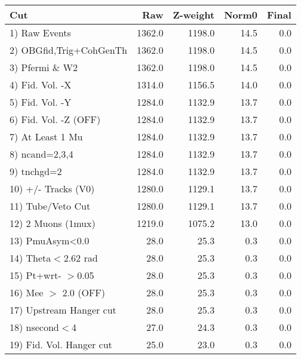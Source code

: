  \begin{table}[h!]\centering
 \begin{tabular}{||l||r|r|r|r||}
 \hline
 \hline
 Cut & Raw & Z-weight & Norm0 & Final \\
 \hline
  1) Raw Events           &      1362.0 &      1198.0 &        14.5 &         0.0 \\
  2) OBGfid,Trig+CohGenTh &      1362.0 &      1198.0 &        14.5 &         0.0 \\
  3) Pfermi \& W2         &      1362.0 &      1198.0 &        14.5 &         0.0 \\
  4) Fid. Vol. -X         &      1314.0 &      1156.5 &        14.0 &         0.0 \\
  5) Fid. Vol. -Y         &      1284.0 &      1132.9 &        13.7 &         0.0 \\
  6) Fid. Vol. -Z (OFF)   &      1284.0 &      1132.9 &        13.7 &         0.0 \\
  7) At Least 1 Mu        &      1284.0 &      1132.9 &        13.7 &         0.0 \\
  8) ncand=2,3,4          &      1284.0 &      1132.9 &        13.7 &         0.0 \\
  9) tnchgd=2             &      1284.0 &      1132.9 &        13.7 &         0.0 \\
 10) +/- Tracks (V0)      &      1280.0 &      1129.1 &        13.7 &         0.0 \\
 11) Tube/Veto Cut        &      1280.0 &      1129.1 &        13.7 &         0.0 \\
 12) 2 Muons (1mux)       &      1219.0 &      1075.2 &        13.0 &         0.0 \\
 13) PmuAsym<0.0          &        28.0 &        25.3 &         0.3 &         0.0 \\
 14) Theta$<$2.62 rad     &        28.0 &        25.3 &         0.3 &         0.0 \\
 15) Pt+wrt- $>$0.05      &        28.0 &        25.3 &         0.3 &         0.0 \\
 16) Mee $>$ 2.0  (OFF)   &        28.0 &        25.3 &         0.3 &         0.0 \\
 17) Upstream Hanger cut  &        28.0 &        25.3 &         0.3 &         0.0 \\
 18) nsecond$<$4          &        27.0 &        24.3 &         0.3 &         0.0 \\
 19) Fid. Vol. Hanger cut &        25.0 &        23.0 &         0.3 &         0.0 \\

\end{tabular}
\end{table}
